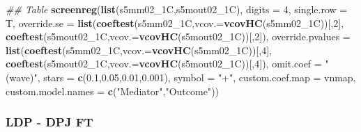 \documentclass[
]{article}
\newenvironment{Shaded}{\begin{snugshade}}{\end{snugshade}}
\newcommand{\CommentTok}[1]{\textcolor[rgb]{0.56,0.35,0.01}{\textit{#1}}}
\newcommand{\DataTypeTok}[1]{\textcolor[rgb]{0.13,0.29,0.53}{#1}}
\newcommand{\DecValTok}[1]{\textcolor[rgb]{0.00,0.00,0.81}{#1}}
\newcommand{\FloatTok}[1]{\textcolor[rgb]{0.00,0.00,0.81}{#1}}
\newcommand{\KeywordTok}[1]{\textcolor[rgb]{0.13,0.29,0.53}{\textbf{#1}}}
\newcommand{\NormalTok}[1]{#1}
\newcommand{\StringTok}[1]{\textcolor[rgb]{0.31,0.60,0.02}{#1}}
\begin{document}
\begin{Shaded}
\begin{Highlighting}[]
\CommentTok{## Table}
\KeywordTok{screenreg}\NormalTok{(}\KeywordTok{list}\NormalTok{(s5mm02_1C,s5mout02_1C), }\DataTypeTok{digits =} \DecValTok{4}\NormalTok{, }\DataTypeTok{single.row =}\NormalTok{ T,}
          \DataTypeTok{override.se =} \KeywordTok{list}\NormalTok{(}\KeywordTok{coeftest}\NormalTok{(s5mm02_1C,}\DataTypeTok{vcov.=}\KeywordTok{vcovHC}\NormalTok{(s5mm02_1C))[,}\DecValTok{2}\NormalTok{],}
                             \KeywordTok{coeftest}\NormalTok{(s5mout02_1C,}\DataTypeTok{vcov.=}\KeywordTok{vcovHC}\NormalTok{(s5mout02_1C))[,}\DecValTok{2}\NormalTok{]),}
          \DataTypeTok{override.pvalues =} \KeywordTok{list}\NormalTok{(}\KeywordTok{coeftest}\NormalTok{(s5mm02_1C,}\DataTypeTok{vcov.=}\KeywordTok{vcovHC}\NormalTok{(s5mm02_1C))[,}\DecValTok{4}\NormalTok{],}
                                  \KeywordTok{coeftest}\NormalTok{(s5mout02_1C,}\DataTypeTok{vcov.=}\KeywordTok{vcovHC}\NormalTok{(s5mout02_1C))[,}\DecValTok{4}\NormalTok{]),}
          \DataTypeTok{omit.coef =} \StringTok{"(wave)"}\NormalTok{, }\DataTypeTok{stars =} \KeywordTok{c}\NormalTok{(}\FloatTok{0.1}\NormalTok{,}\FloatTok{0.05}\NormalTok{,}\FloatTok{0.01}\NormalTok{,}\FloatTok{0.001}\NormalTok{), }\DataTypeTok{symbol =} \StringTok{"+"}\NormalTok{,}
          \DataTypeTok{custom.coef.map =}\NormalTok{ vnmap, }
          \DataTypeTok{custom.model.names =} \KeywordTok{c}\NormalTok{(}\StringTok{"Mediator"}\NormalTok{,}\StringTok{"Outcome"}\NormalTok{))}
\end{Highlighting}
\end{Shaded}

\hypertarget{ldp---dpj-ft}{%
\subsubsection{LDP - DPJ FT}\label{ldp---dpj-ft}}
\end{document}
